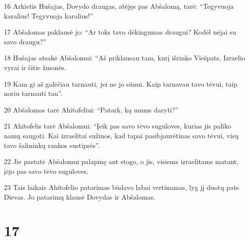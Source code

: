 \par 16 Arkietis Hušajas, Dovydo draugas, atėjęs pas Abšalomą, tarė: “Tegyvuoja karalius! Tegyvuoja karalius!” 
\par 17 Abšalomas paklausė jo: “Ar toks tavo dėkingumas draugui? Kodėl nėjai su savo draugu?” 
\par 18 Hušajas atsakė Abšalomui: “Aš priklausau tam, kurį išrinko Viešpats, Izraelio vyrai ir šitie žmonės. 
\par 19 Kam gi aš galėčiau tarnauti, jei ne jo sūnui. Kaip tarnavau tavo tėvui, taip noriu tarnauti tau”. 
\par 20 Abšalomas tarė Ahitofeliui: “Patark, ką mums daryti?” 
\par 21 Ahitofelis tarė Abšalomui: “Įeik pas savo tėvo suguloves, kurias jis paliko namų saugoti. Kai izraelitai sužinos, kad tapai pasibjaurėtinas savo tėvui, visų tavo šalininkų rankos sustiprės”. 
\par 22 Jie pastatė Abšalomui palapinę ant stogo, o jis, visiems izraelitams matant, įėjo pas savo tėvo suguloves. 
\par 23 Tais laikais Ahitofelio patarimas būdavo labai vertinamas, lyg jį duotų pats Dievas. Jo patarimų klausė Dovydas ir Abšalomas.



\chapter{17}

